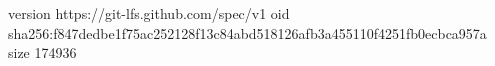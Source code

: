 version https://git-lfs.github.com/spec/v1
oid sha256:f847dedbe1f75ac252128f13c84abd518126afb3a455110f4251fb0ecbca957a
size 174936
